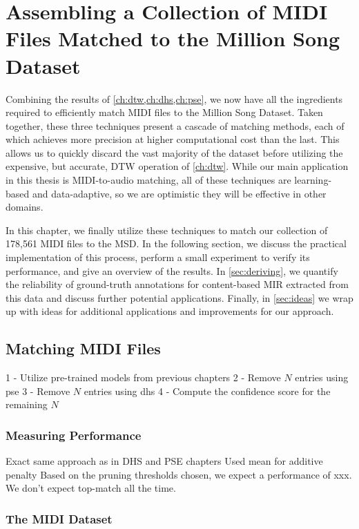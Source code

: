 \chapter{Assembling a Collection of MIDI Files Matched to the Million Song Dataset}
\label{ch:assembling}

Combining the results of \cref{ch:dtw,ch:dhs,ch:pse}, we now have all the ingredients required to efficiently match MIDI files to the Million Song Dataset.
Taken together, these three techniques present a cascade of matching methods, each of which achieves more precision at higher computational cost than the last.
This allows us to quickly discard the vast majority of the dataset before utilizing the expensive, but accurate, DTW operation of \cref{ch:dtw}.
While our main application in this thesis is MIDI-to-audio matching, all of these techniques are learning-based and data-adaptive, so we are optimistic they will be effective in other domains.

In this chapter, we finally utilize these techniques to match our collection of 178,561 MIDI files to the MSD.
In the following section, we discuss the practical implementation of this process, perform a small experiment to verify its performance, and give an overview of the results.
In \cref{sec:deriving}, we quantify the reliability of ground-truth annotations for content-based MIR extracted from this data and discuss further potential applications.
Finally, in \cref{sec:ideas} we wrap up with ideas for additional applications and improvements for our approach.

\section{Matching MIDI Files}

1 - Utilize pre-trained models from previous chapters
2 - Remove $N$ entries using pse
3 - Remove $N$ entries using dhs
4 - Compute the confidence score for the remaining $N$

\subsection{Measuring Performance}

Exact same approach as in DHS and PSE chapters
Used mean for additive penalty
Based on the pruning thresholds chosen, we expect a performance of xxx.
We don't expect top-match all the time.

\subsection{The MIDI Dataset}

